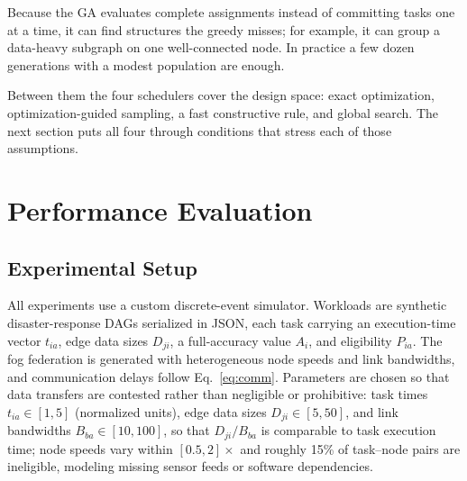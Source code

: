 \documentclass[conference]{IEEEtran}
\begin{document}
Because the GA evaluates complete assignments instead of committing tasks one at a time, it can find structures the greedy misses; for example, it can group a data-heavy subgraph on one well-connected node. In practice a few dozen generations with a modest population are enough.

Between them the four schedulers cover the design space: exact optimization, optimization-guided sampling, a fast constructive rule, and global search. The next section puts all four through conditions that stress each of those assumptions.

\section{Performance Evaluation}
\label{sec:evaluation}

\subsection{Experimental Setup}

All experiments use a custom discrete-event simulator. Workloads are synthetic disaster-response DAGs serialized in JSON, each task carrying an execution-time vector $t_{ia}$, edge data sizes $D_{ji}$, a full-accuracy value $A_i$, and eligibility $P_{ia}$. The fog federation is generated with heterogeneous node speeds and link bandwidths, and communication delays follow Eq.~\eqref{eq:comm}. Parameters are chosen so that data transfers are contested rather than negligible or prohibitive: task times $t_{ia}\in[1,5]$ (normalized units), edge data sizes $D_{ji}\in[5,50]$, and link bandwidths $B_{ba}\in[10,100]$, so that $D_{ji}/B_{ba}$ is comparable to task execution time; node speeds vary within $[0.5,2]\times$ and roughly 15\% of task--node pairs are ineligible, modeling missing sensor feeds or software dependencies.
\end{document}
